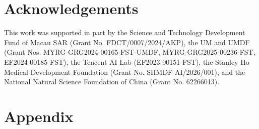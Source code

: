 \documentclass[11pt]{article}
\begin{document}
\section*{Acknowledgements}


This work was supported in part by the Science and Technology Development Fund of Macau SAR (Grant No. FDCT/0007/2024/AKP), the UM and UMDF (Grant Nos. MYRG-GRG2024-00165-FST-UMDF, MYRG-GRG2025-00236-FST, EF2024-00185-FST), the Tencent AI Lab (EF2023-00151-FST), the Stanley Ho Medical Development Foundation (Grant No. SHMDF-AI/2026/001), and the National Natural Science Foundation of China (Grant No. 62266013).






%


\appendix

\section{Appendix}
\label{sec: appendix}




\end{document}
